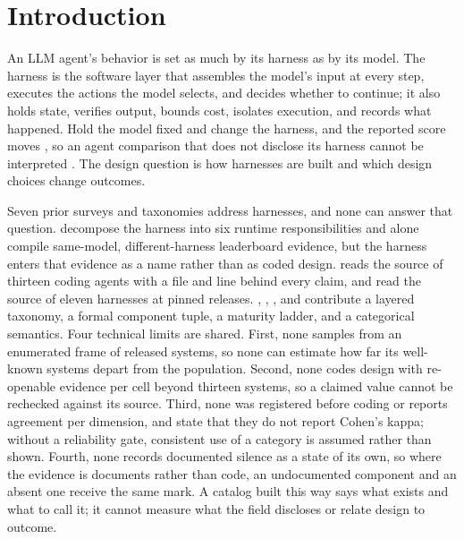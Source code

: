 \section{Introduction}
\label{sec:intro}

An LLM agent's behavior is set as much by its harness as by its model. The harness is the software
layer that assembles the model's input at every step, executes the actions the model selects, and
decides whether to continue; it also holds state, verifies output, bounds cost, isolates execution,
and records what happened. Hold the model fixed and change the harness, and the reported score moves
\citep{guo2026qa2task}, so an agent comparison that does not disclose its harness cannot be
interpreted \citep{zhang2026harnessreporting}. The design question is how harnesses are built and
which design choices change outcomes.

Seven prior surveys and taxonomies address harnesses, and none can answer that question.
\citet{guo2026qa2task} decompose the harness into six runtime responsibilities and alone compile
same-model, different-harness leaderboard evidence, but the harness enters that evidence as a name
rather than as coded design. \citet{rombaut2026insidescaffold} reads the source of thirteen coding
agents with a file and line behind every claim, and \citet{barbaste2026anatomy} read the source of
eleven harnesses at pinned releases.
\citet{li2026harnessengineering}, \citet{meng2026harnesssurvey}, \citet{zhong2026responsibilities},
and \citet{harnesscategorical2026} contribute a layered taxonomy, a formal component tuple, a maturity
ladder, and a categorical semantics. Four technical limits are shared. First, none samples from an
enumerated frame of released systems, so none can estimate how far its well-known systems depart from
the population. Second, none codes design with re-openable evidence per cell beyond thirteen systems,
so a claimed value cannot be rechecked against its source. Third, none was registered before coding
or reports agreement per dimension, and \citet{li2026harnessengineering} state that they do not report
Cohen's kappa; without a reliability gate, consistent use of a category is assumed rather than shown.
Fourth, none records documented silence as a state of its own, so where the evidence is documents
rather than code, an undocumented component and an absent one receive the same mark. A catalog built
this way says what exists and what to call it; it cannot measure what the field discloses or relate
design to outcome.

